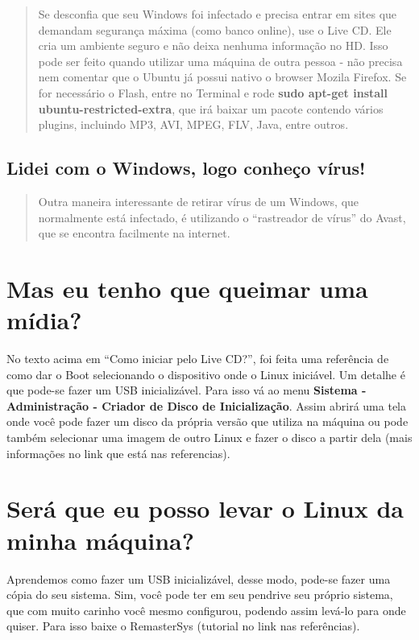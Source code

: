 \documentclass[12pt, a4paper, tocpage=plain]{abnt} %
\begin{document}
\begin{quote}
Se desconfia que seu Windows foi infectado e precisa entrar em sites que demandam segurança máxima (como banco online), use o Live CD. Ele cria um ambiente seguro e não deixa nenhuma informação no HD. Isso pode ser feito quando utilizar uma máquina de outra pessoa - não precisa nem comentar que o Ubuntu já possui nativo o browser Mozila Firefox. Se for necessário o Flash, entre no Terminal e rode {\bf sudo apt-get install ubuntu-restricted-extra}, que irá baixar um pacote contendo vários plugins, incluindo MP3, AVI, MPEG, FLV, Java, entre outros.
\end{quote}

\section{Lidei com o Windows, logo conheço vírus!}

\begin{quote}
Outra maneira interessante de retirar vírus de um Windows, que normalmente está infectado, é utilizando o “rastreador de vírus” do Avast, que se encontra facilmente na internet.
\end{quote}

\chapter{Mas eu tenho que queimar uma mídia?}

No texto acima em “Como iniciar pelo Live CD?”, foi feita uma referência de como dar o Boot selecionando o dispositivo onde o Linux iniciável. Um detalhe é que pode-se fazer um USB inicializável. Para isso vá ao menu {\bf Sistema - Administração - Criador de Disco de Inicialização}. Assim abrirá uma tela onde você pode fazer um disco da própria versão que utiliza na máquina ou pode também selecionar uma imagem de outro Linux e fazer o disco a partir dela (mais informações no link que está nas referencias).

\chapter{Será que eu posso levar o Linux da minha máquina?}

Aprendemos como fazer um USB inicializável, desse modo, pode-se fazer uma cópia do seu sistema. Sim, você pode ter em seu pendrive seu próprio sistema, que com muito carinho você mesmo configurou, podendo assim levá-lo para onde quiser. Para isso baixe o RemasterSys (tutorial no link nas referências).
\end{document}
